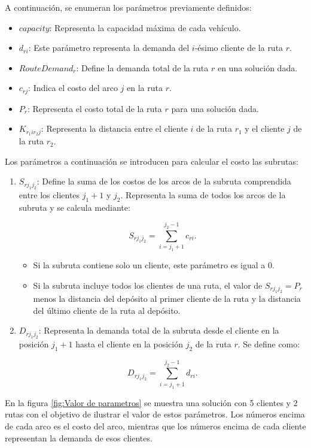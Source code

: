 \documentclass[12pt]{report}
\begin{document}
	A continuación, se enumeran los parámetros previamente definidos:
	\begin{itemize}
		\item $capacity$: Representa la capacidad máxima de cada vehículo.
		\item $d_{ri}$: Este parámetro representa la demanda del $i$-ésimo cliente de la ruta $r$.
		\item $RouteDemand_r$: Define la demanda total de la ruta $r$ en una solución dada.
		\item $c_{rj}$: Indica el costo del arco $j$ en la ruta $r$.
		\item $P_r$: Representa el costo total de la ruta $r$ para una solución dada.
		\item $K_{r_1ir_2j}$: Representa la distancia entre el cliente $i$ de la ruta $r_1$ y el cliente $j$ de la ruta $r_2$.
	\end{itemize}

	Los parámetros a continuación se introducen para calcular el costo las subrutas:

	\begin{enumerate}


		\item{$S_{rj_1j_2}$: Define la suma de los costos de los arcos de la subruta comprendida entre los clientes $j_1+1$ y $j_2$. Representa la suma de todos los arcos de la subruta y se calcula mediante:}

		\[
		S_{rj_1j_2}=\sum\limits_{i=j_1+1}^{j_2-1} c_{ri}.
		\]
		\begin{itemize}
			\item
			Si la subruta contiene solo un cliente, este parámetro es igual a 0.
			\item
			Si la subruta incluye todos los clientes de una ruta, el valor de $S_{rj_1j_2} = P_r$ menos la distancia del depósito al primer cliente de la ruta y la distancia del último cliente de la ruta al depósito.
		\end{itemize}

		\item {$D_{rj_1j_2}$: Representa la demanda total de la subruta desde el cliente en la posición $j_1+1$ hasta el cliente en la posición $j_2$ de la ruta $r$. Se define como:}

		\[
		D_{rj_1j_2}=\sum\limits_{i=j_1+1}^{j_2-1} d_{ri}.
		\]
	\end{enumerate}

	En la figura \ref{fig:Valor de parametros} se muestra una solución con 5 clientes y 2 rutas con el objetivo de ilustrar el valor de estos parámetros. Los números encima de cada arco es el costo del arco, mientras que los números encima de cada cliente representan la demanda de esos clientes.
\end{document}
